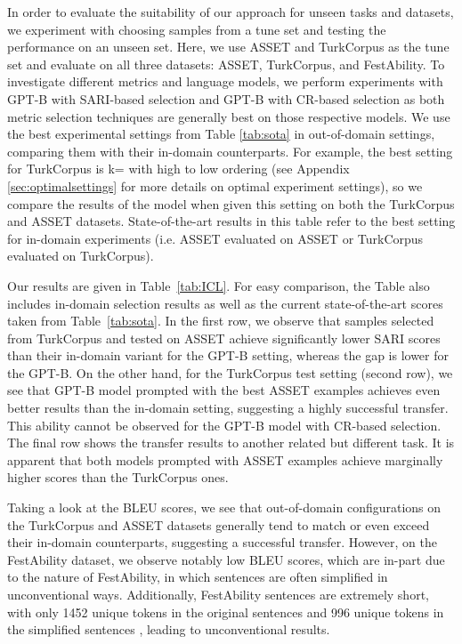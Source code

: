 \documentclass[11pt]{article}
\begin{document}
In order to evaluate the suitability of our approach for unseen tasks and datasets, we experiment with choosing samples from a tune set and testing the performance on an unseen set. Here, we use ASSET and TurkCorpus as the tune set and evaluate on all three datasets: ASSET, TurkCorpus, and FestAbility. To investigate different metrics and language models, we perform experiments with GPT-B with SARI-based selection and GPT-B with CR-based selection as both metric selection techniques are generally best on those respective models. We use the best experimental settings from Table \ref{tab:sota} in out-of-domain settings, comparing them with their in-domain counterparts. For example, the best setting for TurkCorpus is k= with high to low ordering (see Appendix \ref{sec:optimalsettings} for more details on optimal experiment settings), so we compare the results of the model when given this setting on both the TurkCorpus and ASSET datasets. State-of-the-art results in this table refer to the best setting for in-domain experiments (i.e. ASSET evaluated on ASSET or TurkCorpus evaluated on TurkCorpus).  

Our results are given in Table~\ref{tab:ICL}. For easy comparison, the Table also includes in-domain selection results as well as the current state-of-the-art scores taken from Table~\ref{tab:sota}. In the first row, we observe that samples selected from TurkCorpus and tested on ASSET achieve significantly lower SARI scores than their in-domain variant for the GPT-B setting, whereas the gap is lower for the GPT-B. On the other hand, for the TurkCorpus test setting (second row), we see that GPT-B model prompted with the best ASSET examples achieves even better results than the in-domain setting, suggesting a highly successful transfer. This ability cannot be observed for the GPT-B model with CR-based selection. The final row shows the transfer results to another related but different task. It is apparent that both models prompted with ASSET examples achieve marginally higher scores than the TurkCorpus ones.

Taking a look at the BLEU scores, we see that out-of-domain configurations on the TurkCorpus and ASSET datasets generally tend to match or even exceed their in-domain counterparts, suggesting a successful transfer. However, on the FestAbility dataset, we observe notably low BLEU scores, which are in-part due to the nature of FestAbility, in which sentences are often simplified in unconventional ways. Additionally, FestAbility sentences are extremely short, with only 1452 unique tokens in the original sentences and 996 unique tokens in the simplified sentences \citep{chamovitz2022cognitive}, leading to unconventional results.
\end{document}
